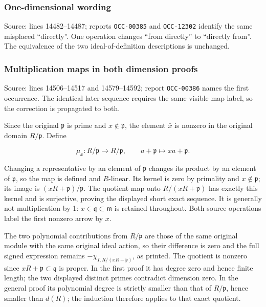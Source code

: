 \subsubsection{One-dimensional wording}\label{one-dimensional-wording}

Source: lines 14482--14487; reports \texttt{OCC-00385} and \texttt{OCC-12302} identify the same misplaced ``directly''. One operation changes ``from directly'' to ``directly from''. The equivalence of the two ideal-of-definition descriptions is unchanged.

\subsubsection{Multiplication maps in both dimension proofs}\label{multiplication-maps-in-both-dimension-proofs}

Source: lines 14506--14517 and 14579--14592; report \texttt{OCC-00386} names the first occurrence. The identical later sequence requires the same visible map label, so the correction is propagated to both.

Since the original \(\mathfrak p\) is prime and \(x\notin\mathfrak p\), the element \(\bar x\) is nonzero in the original domain \(R/\mathfrak p\). Define

\[
\mu_x:R/\mathfrak p\longrightarrow R/\mathfrak p,
\qquad a+\mathfrak p\longmapsto xa+\mathfrak p.
\]

Changing a representative by an element of \(\mathfrak p\) changes its product by an element of \(\mathfrak p\), so the map is defined and \(R\)-linear. Its kernel is zero by primality and \(x\notin\mathfrak p\); its image is \((xR+\mathfrak p)/\mathfrak p\). The quotient map onto \(R/(xR+\mathfrak p)\) has exactly this kernel and is surjective, proving the displayed short exact sequence. It is generally not multiplication by 1: \(x\in\mathfrak q\subset\mathfrak m\) is retained throughout. Both source operations label the first nonzero arrow by \(x\).

The two polynomial contributions from \(R/\mathfrak p\) are those of the same original module with the same original ideal action, so their difference is zero and the full signed expression remains \(-\chi_{I,R/(xR+\mathfrak p)}\), as printed. The quotient is nonzero since \(xR+\mathfrak p\subset\mathfrak q\) is proper. In the first proof it has degree zero and hence finite length; the two displayed distinct primes contradict dimension zero. In the general proof its polynomial degree is strictly smaller than that of \(R/\mathfrak p\), hence smaller than \(d(R)\); the induction therefore applies to that exact quotient.

